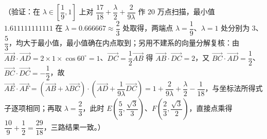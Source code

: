 \begin{answer}
（验证：在 \(\lambda\in\left[\dfrac19,1\right]\) 上对 \(\dfrac{17}{18}+\dfrac{\lambda}2+\dfrac2{9\lambda}\) 作 20 万点扫描，最小值 \(1.611111111111\) 在 \(\lambda=0.666667\approx\dfrac23\) 处取得，两端点 \(\lambda=\dfrac19\)、\(\lambda=1\) 处分别为 \(3\)、\(\dfrac53\)，均大于最小值，最小值确在内点取到；另用不建系的向量分解复核：由 \(\overrightarrow{AB}\cdot\overrightarrow{AD}=2\times1\times\cos60^{\circ}=1\)、\(\overrightarrow{DC}=\dfrac12\overrightarrow{AB}\) 得 \(\overrightarrow{AB}\cdot\overrightarrow{DC}=2\)，又 \(\overrightarrow{BC}\cdot\overrightarrow{AD}=\dfrac12\)、\(\overrightarrow{BC}\cdot\overrightarrow{DC}=-\dfrac12\)，故 \(\overrightarrow{AE}\cdot\overrightarrow{AF}=\left(\overrightarrow{AB}+\lambda\overrightarrow{BC}\right)\cdot\left(\overrightarrow{AD}+\dfrac1{9\lambda}\overrightarrow{DC}\right)=1+\dfrac2{9\lambda}+\dfrac{\lambda}2-\dfrac1{18}\)，与坐标法所得式子逐项相同；再取 \(\lambda=\dfrac23\)，此时 \(E\left(\dfrac53,\dfrac{\sqrt3}3\right)\)、\(F\left(\dfrac23,\dfrac{\sqrt3}2\right)\)，直接点乘得 \(\dfrac{10}9+\dfrac12=\dfrac{29}{18}\)，三路结果一致。）


\end{answer}
